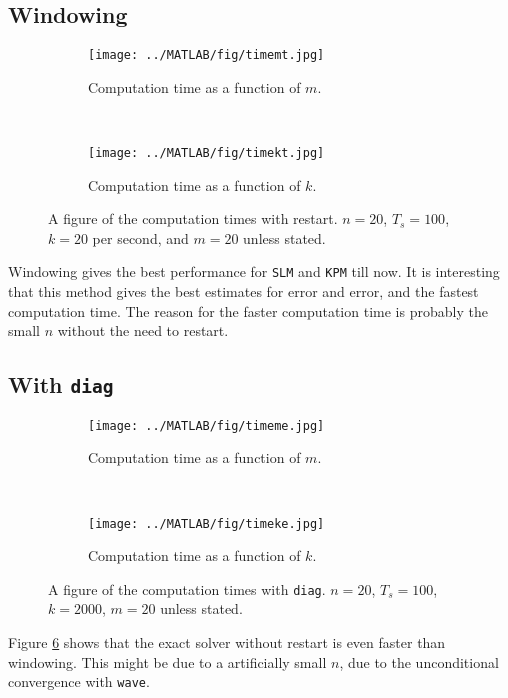 \subsection{Windowing}
\begin{figure}[H]
        \centering
        \begin{subfigure}[b]{0.45\textwidth}
                \texttt{[image: ../MATLAB/fig/timemt.jpg]}
                \caption{ Computation time as a function of $m$. }
                \label{fig:timemt}
        \end{subfigure}
        ~
        \begin{subfigure}[b]{0.45\textwidth}
                \texttt{[image: ../MATLAB/fig/timekt.jpg]}
                \caption{ Computation time as a function of $k$. }
                \label{fig:timekt}
        \end{subfigure}
        \caption{ A figure of the computation times with restart. $n = 20$, $T_s = 100$, $k = 20$ per second, and $m = 20$ unless stated. }
        \label{fig:time2}
\end{figure}
Windowing gives the best performance for \texttt{SLM} and \texttt{KPM} till now. It is interesting that this method gives the best estimates for error and error, and the fastest computation time. The reason for the faster computation time is probably the small $n$ without the need to restart. 
\subsection{With \texttt{diag}}
\begin{figure}[H]
        \centering
        \begin{subfigure}[b]{0.45\textwidth}
                \texttt{[image: ../MATLAB/fig/timeme.jpg]}
                \caption{ Computation time as a function of $m$. }
                \label{fig:timeme}
        \end{subfigure}
        ~
        \begin{subfigure}[b]{0.45\textwidth}
                \texttt{[image: ../MATLAB/fig/timeke.jpg]}
                \caption{ Computation time as a function of $k$. }
                \label{fig:timeke}
        \end{subfigure}
        \caption{ A figure of the computation times with \texttt{diag}. $n = 20$, $T_s = 100$, $k = 2000$, $m = 20$ unless stated. }
        \label{fig:time3}
\end{figure}
Figure \ref{fig:time3} shows that the exact solver without restart is even faster than windowing. This might be due to a artificially small $n$, due to the unconditional convergence with \texttt{wave}.
